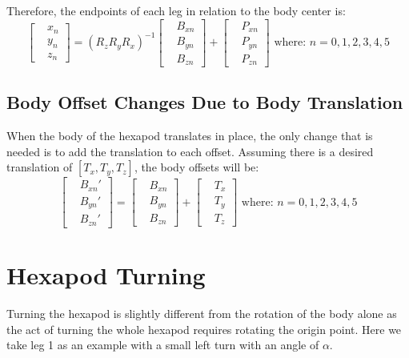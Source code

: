\documentclass[12pt, letterpaper]{article}
\begin{document}
				Therefore, the endpoints of each leg in relation to the body center is:
				\begin{equation*}				
					\begin{bmatrix}
						&x_n \\
    					&y_n \\
    					&z_n
					\end{bmatrix}
					= (R_zR_yR_x)^{-1}
					\begin{bmatrix}
						&B_{xn} \\
    					&B_{yn} \\
    					&B_{zn}
					\end{bmatrix}
					+
					\begin{bmatrix}
						&P_{xn} \\
    					&P_{yn} \\
    					&P_{zn}
					\end{bmatrix}
					\text{ where: } n = 0,1,2,3,4,5
				\end{equation*}
			\subsection{Body Offset Changes Due to Body Translation}
				When the body of the hexapod translates in place, the only change that is needed is to add the translation to each offset. Assuming there is a desired translation of $[T_x, T_y, T_z]$, the body offsets will be:
				\begin{equation*}
					\begin{bmatrix}
						&B_{xn}' \\
    					&B_{yn}' \\
    					&B_{zn}'
					\end{bmatrix}
					=
					\begin{bmatrix}
						&B_{xn} \\
    					&B_{yn} \\
    					&B_{zn}
					\end{bmatrix}
					+
					\begin{bmatrix}
						&T_{x} \\
    					&T_{y} \\
    					&T_{z}
					\end{bmatrix}
					\text{ where: } n = 0,1,2,3,4,5
				\end{equation*}
			
		\section{Hexapod Turning}
			Turning the hexapod is slightly different from the rotation of the body alone as the act of turning the whole hexapod requires rotating the origin point. Here we take leg 1 as an example with a small left turn with an angle of $\alpha$.
		
\end{document}
